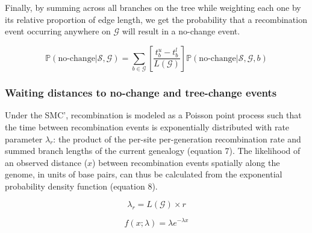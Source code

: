 \documentclass[11pt]{article}
\begin{document}
\noindent Finally, by summing across all branches on the tree 
while weighting each one by its relative proportion of edge length,
we get the probability that a recombination event occurring anywhere on 
$\mathcal{G}$ will result in a no-change event. %

\begin{equation}
	\mathbb{P}(\text{no-change} | \mathcal{S},\mathcal{G}) = 
	\sum_{b \in \mathcal{G}}
	\left[\frac{t^u_b - t^l_b}{L(\mathcal{G})}\right]
	\mathbb{P}(\text{no-change} | \mathcal{S},\mathcal{G},b)
\end{equation}


\subsubsection{Waiting distances to no-change and tree-change events}
Under the SMC', recombination is modeled as a Poisson point process 
such that the time between recombination events is exponentially distributed 
with rate parameter $\lambda_r$: the product of the per-site
per-generation recombination rate and summed branch lengths of
the current genealogy \citep{wiuf_recombination_1999} (equation 7).
The likelihood of an observed distance ($x$) between recombination
events spatially along the genome, in units of base pairs, can thus 
be calculated from the exponential probability density function 
(equation 8).


\begin{equation}
	\lambda_{r} = L(\mathcal{G}) \times r
\end{equation}


\begin{equation}
	f(x; \lambda) = \lambda e^{-\lambda x}
\end{equation}
\end{document}
